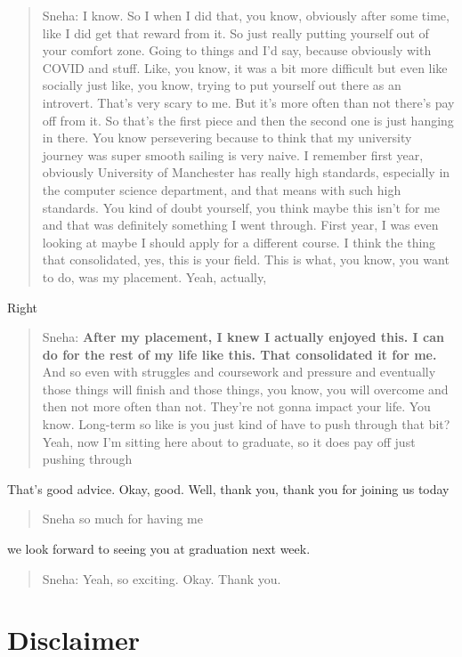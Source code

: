 \documentclass[
]{book}
\begin{document}
\begin{quote}
Sneha: I know. So I when I did that, you know, obviously after some time, like I did get that reward from it. So just really putting yourself out of your comfort zone. Going to things and I'd say, because obviously with COVID and stuff. Like, you know, it was a bit more difficult but even like socially just like, you know, trying to put yourself out there as an introvert. That's very scary to me. But it's more often than not there's pay off from it. So that's the first piece and then the second one is just hanging in there. You know persevering because to think that my university journey was super smooth sailing is very naive. I remember first year, obviously University of Manchester has really high standards, especially in the computer science department, and that means with such high standards. You kind of doubt yourself, you think maybe this isn't for me and that was definitely something I went through. First year, I was even looking at maybe I should apply for a different course. I think the thing that consolidated, yes, this is your field. This is what, you know, you want to do, was my placement. Yeah, actually,
\end{quote}

Right

\begin{quote}
Sneha: \textbf{After my placement, I knew I actually enjoyed this. I can do for the rest of my life like this. That consolidated it for me.} And so even with struggles and coursework and pressure and eventually those things will finish and those things, you know, you will overcome and then not more often than not. They're not gonna impact your life. You know. Long-term so like is you just kind of have to push through that bit? Yeah, now I'm sitting here about to graduate, so it does pay off just pushing through
\end{quote}

That's good advice. Okay, good. Well, thank you, thank you for joining us today

\begin{quote}
Sneha so much for having me
\end{quote}

we look forward to seeing you at graduation next week.

\begin{quote}
Sneha: Yeah, so exciting. Okay. Thank you.
\end{quote}

\hypertarget{disclaimer-4}{%
\section{Disclaimer}\label{disclaimer-4}}
\end{document}
